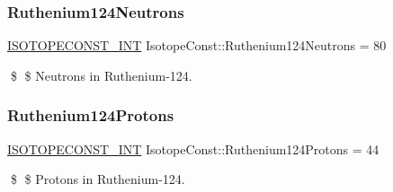\subsubsection{\texorpdfstring{Ruthenium124\+Neutrons}{Ruthenium124Neutrons}}
{\footnotesize\ttfamily \mbox{\hyperlink{group___isotope_const-_macros_ga5f18360b3e99483a35c32d789e62621c}{I\+S\+O\+T\+O\+P\+E\+C\+O\+N\+S\+T\+\_\+\+I\+NT}} Isotope\+Const\+::\+Ruthenium124\+Neutrons = 80}

\$ \$ Neutrons in Ruthenium-\/124. \mbox{\label{group___isotope_const-_ruthenium-_ru124_gad3b2789afe3bcc988369cd1558b7e62d}} 
\subsubsection{\texorpdfstring{Ruthenium124\+Protons}{Ruthenium124Protons}}
{\footnotesize\ttfamily \mbox{\hyperlink{group___isotope_const-_macros_ga5f18360b3e99483a35c32d789e62621c}{I\+S\+O\+T\+O\+P\+E\+C\+O\+N\+S\+T\+\_\+\+I\+NT}} Isotope\+Const\+::\+Ruthenium124\+Protons = 44}

\$ \$ Protons in Ruthenium-\/124. 